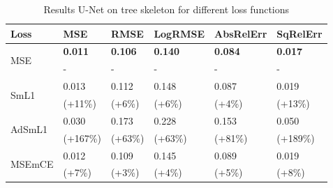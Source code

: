 { \setlength{\tabcolsep}{4pt}
\begin{table}[!t]
\caption{Results U-Net on tree skeleton for different loss functions}
\label{tab:res_losses_branch}
\begin{tabular}{@{}l|lllll@{}}
\toprule
Loss  & MSE \phantom{iiiiiii} & RMSE \phantom{iiii} & LogRMSE & AbsRelErr & SqRelErr \\ \hline \hline
\multirow{2}{*}{MSE} & \textbf{0.011} & \textbf{0.106} & \textbf{0.140} & \textbf{0.084} & \textbf{0.017} \\
&\phantom{iiii}- & \phantom{iiii}- &\phantom{iiii}- & \phantom{iiii}- & \phantom{iiii}- \\ \hline
\multirow{2}{*}{SmL1} & 0.013 & 0.112 & 0.148 & 0.087 & 0.019 \\
& (+11\%) &(+6\%) &(+6\%) &(+4\%) &(+13\%)  \\ \hline
\multirow{2}{*}{AdSmL1} & 0.030 & 0.173	&0.228	&0.153	&0.050 \\
&(+167\%) &(+63\%) &(+63\%) &(+81\%) &(+189\%)  \\ \hline
\multirow{2}{*}{MSEmCE} & 0.012	&0.109	&0.145	&0.089	& 0.019 \\
&(+7\%) &(+3\%) &(+4\%) &(+5\%) &(+8\%)  \\ \bottomrule
\end{tabular}
\end{table}
\vspace{\figurevspacebelow} \phantom{i}
}

